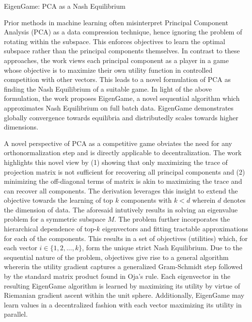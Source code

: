 \documentclass[11pt,letterpaper]{article}
\begin{document}
\begin{center}
  \large{EigenGame: PCA as a Nash Equilibrium}
\end{center}

Prior methods in machine learning often misinterpret Principal Component Analysis (PCA) as a data compression technique, hence ignoring the problem of rotating within the subspace. This enforces objectives to learn the optimal subspace rather than the principal components themselves. In contrast to these approaches, the work views each principal component as a player in a game whose objective is to maximize their own utility function in controlled competition with other vectors. This leads to a novel formulation of PCA as finding the Nash Equilibrium of a suitable game. In light of the above formulation, the work proposes EigenGame, a novel sequential algorithm which approximates Nash Equilibrium on full batch data. EigenGame demonstrates globally convergence towards equilibria and distributedly scales towards higher dimensions. 

A novel perspective of PCA as a competitive game obviates the need for any orthonormalization step and is directly applicable to decentralization. The work highlights this novel view by (1) showing that only maximizing the trace of projection matrix is not sufficient for recovering all principal components and (2) minimizing the off-diagonal terms of matrix is akin to maximizing the trace and can recover all components. The derivation leverages this insight to extend the objective towards the learning of top $k$ components with $k < d$ wherein $d$ denotes the dimension of data. The aforesaid intutively results in solving an eigenvalue problem for a symmetric subspace $M$. The problem further incorporates the hierarchical dependence of top-$k$ eigenvectors and fitting tractable approximations for each of the components. This results in a set of objectives (utilities) which, for each vector $i \in \{1,2,...,k\}$, form the unique strict Nash Equilibrium. Due to the sequential nature of the problem, objectives give rise to a general algorithm whererin the utility gradient captures a generalized Gram-Schmidt step followed by the standard matrix product found in Oja's rule. Each eigenvector in the resulting EigenGame algorithm is learned by maximizing its utility by virtue of Riemanian gradient ascent within the unit sphere. Additionally, EigenGame may learn values in a decentralized fashion with each vector maximizing its utility in parallel. 
\end{document}

